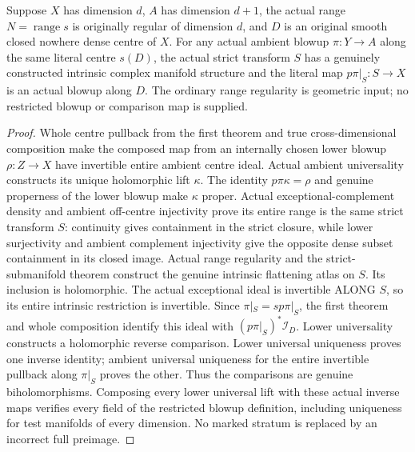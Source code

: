 \begin{theorem}
\label{hir:actual-retract-contact-restricted-blowup}
\leanok
Suppose $X$ has dimension $d$, $A$ has dimension $d+1$, the actual range
$N=\operatorname{range}s$ is originally regular of dimension $d$, and
$D$ is an original smooth closed nowhere dense centre of $X$. For any
actual ambient blowup $\pi:Y\to A$ along the same literal centre $s(D)$,
the actual strict transform $S$ has a genuinely constructed intrinsic
complex manifold structure and the literal map $p\pi|_S:S\to X$ is an
actual blowup along $D$. The ordinary range regularity is geometric input;
no restricted blowup or comparison map is supplied.
\end{theorem}
\begin{proof}
Whole centre pullback from the first theorem and true cross-dimensional
composition make the composed map from an internally chosen lower blowup
$\rho:Z\to X$ have invertible entire ambient centre ideal. Actual ambient
universality constructs its unique holomorphic lift $\kappa$.
The identity $p\pi\kappa=\rho$ and genuine properness of the lower blowup
make $\kappa$ proper. Actual exceptional-complement density and ambient
off-centre injectivity prove its entire range is the same strict transform
$S$: continuity gives containment in the strict closure, while lower
surjectivity and ambient complement injectivity give the opposite dense
subset containment in its closed image. Actual range regularity and the
strict-submanifold theorem construct the genuine intrinsic flattening
atlas on $S$. Its inclusion is holomorphic. The actual exceptional ideal
is invertible ALONG $S$, so its entire intrinsic restriction is invertible.
Since $\pi|_S=sp\pi|_S$, the first theorem and whole composition identify
this ideal with $(p\pi|_S)^*\mathcal I_D$. Lower universality constructs
a holomorphic reverse comparison. Lower universal uniqueness proves one
inverse identity; ambient universal uniqueness for the entire invertible
pullback along $\pi|_S$ proves the other. Thus the comparisons are genuine
biholomorphisms. Composing every lower universal lift with these actual
inverse maps verifies every field of the restricted blowup definition,
including uniqueness for test manifolds of every dimension. No marked
stratum is replaced by an incorrect full preimage.
\end{proof}

